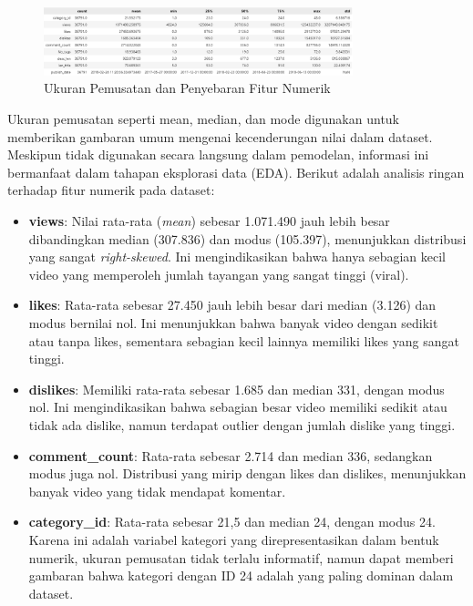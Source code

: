 \begin{figure}[ht]
    \centering
    \includegraphics[width=0.8\textwidth]{gambar/pemusatan.png}
    \caption{Ukuran Pemusatan dan Penyebaran Fitur Numerik}
    \label{fig:ukuran_pemusatan}
\end{figure}

Ukuran pemusatan seperti mean, median, dan mode digunakan untuk memberikan gambaran umum mengenai kecenderungan nilai dalam dataset. Meskipun tidak digunakan secara langsung dalam pemodelan, informasi ini bermanfaat dalam tahapan eksplorasi data (EDA). Berikut adalah analisis ringan terhadap fitur numerik pada dataset:

\begin{itemize}
    \item \textbf{views}: Nilai rata-rata (\textit{mean}) sebesar 1.071.490 jauh lebih besar dibandingkan median (307.836) dan modus (105.397), menunjukkan distribusi yang sangat \textit{right-skewed}. Ini mengindikasikan bahwa hanya sebagian kecil video yang memperoleh jumlah tayangan yang sangat tinggi (viral).
    
    \item \textbf{likes}: Rata-rata sebesar 27.450 jauh lebih besar dari median (3.126) dan modus bernilai nol. Ini menunjukkan bahwa banyak video dengan sedikit atau tanpa likes, sementara sebagian kecil lainnya memiliki likes yang sangat tinggi.
    
    \item \textbf{dislikes}: Memiliki rata-rata sebesar 1.685 dan median 331, dengan modus nol. Ini mengindikasikan bahwa sebagian besar video memiliki sedikit atau tidak ada dislike, namun terdapat outlier dengan jumlah dislike yang tinggi.
    
    \item \textbf{comment\_count}: Rata-rata sebesar 2.714 dan median 336, sedangkan modus juga nol. Distribusi yang mirip dengan likes dan dislikes, menunjukkan banyak video yang tidak mendapat komentar.
    
    \item \textbf{category\_id}: Rata-rata sebesar 21,5 dan median 24, dengan modus 24. Karena ini adalah variabel kategori yang direpresentasikan dalam bentuk numerik, ukuran pemusatan tidak terlalu informatif, namun dapat memberi gambaran bahwa kategori dengan ID 24 adalah yang paling dominan dalam dataset.
\end{itemize}


